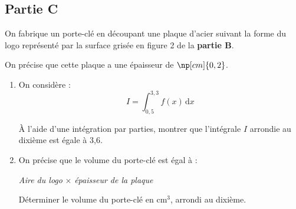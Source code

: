 		\subsection*{\centering Partie C}

			On fabrique un porte-clé en découpant une plaque d'acier suivant la forme du logo représenté par la surface grisée en figure 2 de la \textbf{partie B}.

			On précise que cette plaque a une épaisseur de $\np[cm]{0,2}$.

			\begin{enumerate}
				\item On considère :
				\[I=\int_{0,5}^{3,3} f(x) \,\mathrm{d} x\]

				À l'aide d'une intégration par parties, montrer que l'intégrale $I$ arrondie au dixième est égale à 3,6.

				\item On précise que le volume du porte-clé est égal à :

\begin{center}
\emph{Aire du logo} $\times$ \emph{épaisseur de la plaque}
\end{center}

				Déterminer le volume du porte-clé en $\mathrm{cm}^{3}$, arrondi au dixième.
			\end{enumerate}
